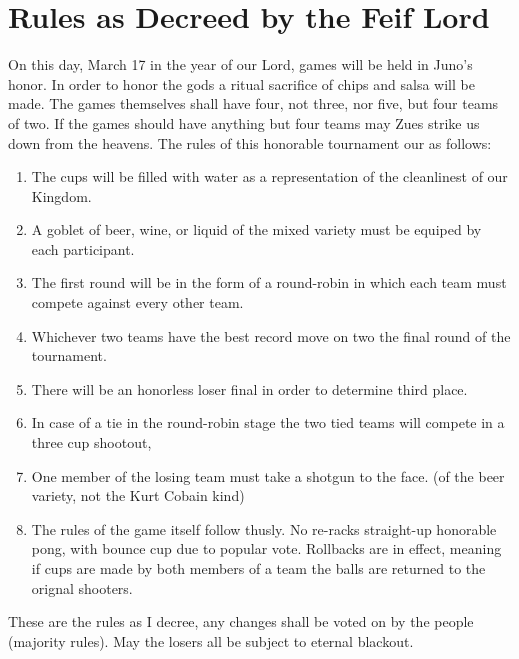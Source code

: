 \documentclass[11pt]{article}
\begin{document}
\vspace*{-.4in}
\section{Rules as Decreed by the Feif Lord}
\label{sec:Rules}
\vspace*{-.1in}


On this day, March 17 in the year of our Lord, games will be held in Juno's honor. In order to honor the gods a ritual sacrifice of chips and salsa will be made. The games themselves shall have four, not three, nor five, but four teams of two. If the games should have anything but four teams may Zues strike us down from the heavens. The rules of this honorable tournament our as follows: \\
   \begin{enumerate}
      \item The cups will be filled with water as a representation of the cleanlinest of our Kingdom.
      \item A goblet of beer, wine, or liquid of the mixed variety must be equiped by each participant.
      \item The first round will be in the form of a round-robin in which each team must compete against every other team.
      \item Whichever two teams have the best record move on two the final round of the tournament.
      \item There will be an honorless loser final in order to determine third place.
      \item In case of a tie in the round-robin stage the two tied teams will compete in a three cup shootout,
      \item One member of the losing team must take a shotgun to the face. (of the beer variety, not the Kurt Cobain kind)
      \item The rules of the game itself follow thusly. No re-racks straight-up honorable pong, with bounce cup due to popular vote. Rollbacks are in effect, meaning if cups are made by both members of a team the balls are returned to the orignal shooters.
    \end{enumerate}
   
These are the rules as I decree, any changes shall be voted on by the people (majority rules). May the losers all be subject to eternal blackout.
\end{document}
